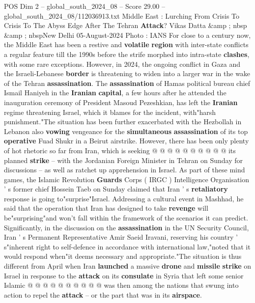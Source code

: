\begin{textsample}{POS Dim 2 – global\_south\_2024\_08 – Score 29.00 – global\_south\_2024\_08/112036913.txt}  \label{ex:f2_pos_016}
Middle East : Lurching From Crisis To Crisis To The Abyss Edge After The Tehran \textbf{Attack}?
Vikas Datta \&amp ; nbsp \&amp ; nbspNew Delhi 05-August-2024 Photo : IANS For close to a century now, the Middle East has been a restive and \textbf{volatile} \textbf{region} with inter-state conflicts a regular feature till the 1990s before the strife morphed into intra-state \textbf{clashes}, with some rare exceptions.
However, in 2024, the ongoing conflict in Gaza and the Israeli-Lebanese \textbf{border} is threatening to widen into a larger war in the wake of the Tehran \textbf{assassination}.
The \textbf{assassination} of Hamas political bureau chief Ismail Haniyeh in the \textbf{Iranian} \textbf{capital}, a few hours after he attended the inauguration ceremony of President Masoud Pezeshkian, has left the \textbf{Iranian} regime threatening Israel, which it blames for the incident, with"harsh punishment."The situation has been further exacerbated with the Hezbollah in Lebanon also \textbf{vowing} vengeance for the \textbf{simultaneous} \textbf{assassination} of its top \textbf{operative} Fuad Shukr in a Beirut airstrike.
However, there has been only plenty of hot rhetoric so far from Iran, which is seeking @ @ @ @ @ @ @ @ @ @ its planned \textbf{strike} -- with the Jordanian Foreign Minister in Tehran on Sunday for discussions -- as well as ratchet up apprehension in Israel.
As part of these mind games, the Islamic Revolution \textbf{Guards} Corps ( IRGC ) Intelligence Organisation ' s former chief Hossein Taeb on Sunday claimed that Iran ' s \textbf{retaliatory} response is going to"surprise"Israel.
Addressing a cultural event in Mashhad, he said that the operation that Iran has designed to take \textbf{revenge} will be"surprising"and won't fall within the framework of the scenarios it can predict.
Significantly, in the discussion on the \textbf{assassination} in the UN Security Council, Iran ' s Permanent Representative Amir Saeid Iravani, reserving his country ' s"inherent right to self-defence in accordance with international law,"noted that it would respond when"it deems necessary and appropriate."The situation is thus different from April when Iran \textbf{launched} a massive \textbf{drone} and \textbf{missile} \textbf{strike} on Israel in response to the \textbf{attack} on its \textbf{consulate} in Syria that left some senior Islamic @ @ @ @ @ @ @ @ @ @ was then among the nations that swung into action to repel the \textbf{attack} -- or the part that was in its \textbf{airspace}.

\end{textsample}
